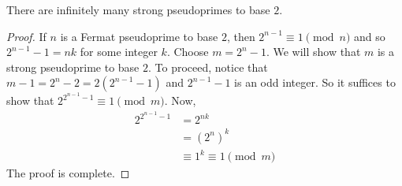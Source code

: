 \begin{proposition}
	There are infinitely many strong pseudoprimes to base $2$.
\end{proposition}

\begin{proof}
	If $n$ is a Fermat pseudoprime to base $2$, then $2^{n-1} \equiv 1 \pmod n$ and so $2^{n-1}-1=nk$ for some integer $k$. Choose $m=2^{n}-1$. We will show that $m$ is a strong pseudoprime to base $2$. To proceed, notice that $m-1=2^n-2=2\left(2^{n-1}-1\right)$ and $2^{n-1}-1$ is an odd integer. So it suffices to show that $2^{2^{n-1}-1} \equiv 1 \pmod m$. Now,
		\begin{align*}
			2^{2^{n-1}-1}
				& = 2^{nk}\\
				& = \left(2^n\right)^k\\
				& \equiv 1^k \equiv 1 \pmod{m}
		\end{align*}
	The proof is complete.
\end{proof}
